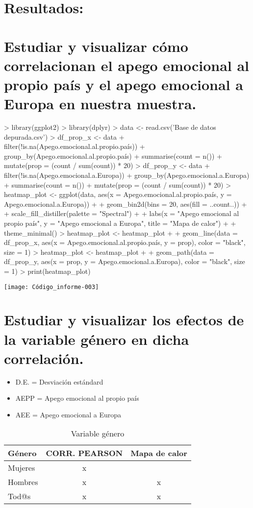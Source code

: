 \documentclass{article}
\begin{document}
\section*{Resultados:}

\section{Estudiar y visualizar cómo correlacionan el apego emocional al propio país y el apego emocional a Europa en nuestra muestra.}

\begin{Schunk}
\begin{Sinput}
> library(ggplot2)
> library(dplyr)
> data <- read.csv('Base de datos depurada.csv')
> df_prop_x <- data %>%
+   filter(!is.na(Apego.emocional.al.propio.país)) %>%
+   group_by(Apego.emocional.al.propio.país) %>%
+   summarise(count = n()) %>%
+   mutate(prop = (count / sum(count)) * 20)
> df_prop_y <- data %>%
+   filter(!is.na(Apego.emocional.a.Europa)) %>%
+   group_by(Apego.emocional.a.Europa) %>%
+   summarise(count = n()) %>%
+   mutate(prop = (count / sum(count)) * 20)
> heatmap_plot <- ggplot(data, aes(x = Apego.emocional.al.propio.país, y = Apego.emocional.a.Europa)) +
+   geom_bin2d(bins = 20, aes(fill = ..count..)) +
+   scale_fill_distiller(palette = "Spectral") +
+   labs(x = "Apego emocional al propio país", y = "Apego emocional a Europa", title = "Mapa de calor") +
+   theme_minimal()
> heatmap_plot <- heatmap_plot +
+   geom_line(data = df_prop_x, aes(x = Apego.emocional.al.propio.país, y = prop), color = "black", size = 1)
> heatmap_plot <- heatmap_plot +
+   geom_path(data = df_prop_y, aes(x = prop, y = Apego.emocional.a.Europa), color = "black", size = 1)
> print(heatmap_plot)
\end{Sinput}
\end{Schunk}
\texttt{[image: Código\_informe-003]}

\section{Estudiar y visualizar los efectos de la variable género en dicha correlación.}
 \begin{itemize}
 \item D.E. = Desviación estándard
 \item AEPP = Apego emocional al propio país
 \item AEE = Apego emocional a Europa
 \end{itemize}
 \begin{table}[h!]
 \caption{Variable género}
 \begin{tabular}{l | c c}
 \hline
 \bf{Género} & \bf{CORR. PEARSON} & \bf{Mapa de calor}\\
 \hline
 Mujeres & x & \\
 Hombres & x & x \\
 Tod@s & x & x \\
 \hline
 \end{tabular}
 \end{table}
\end{document}
